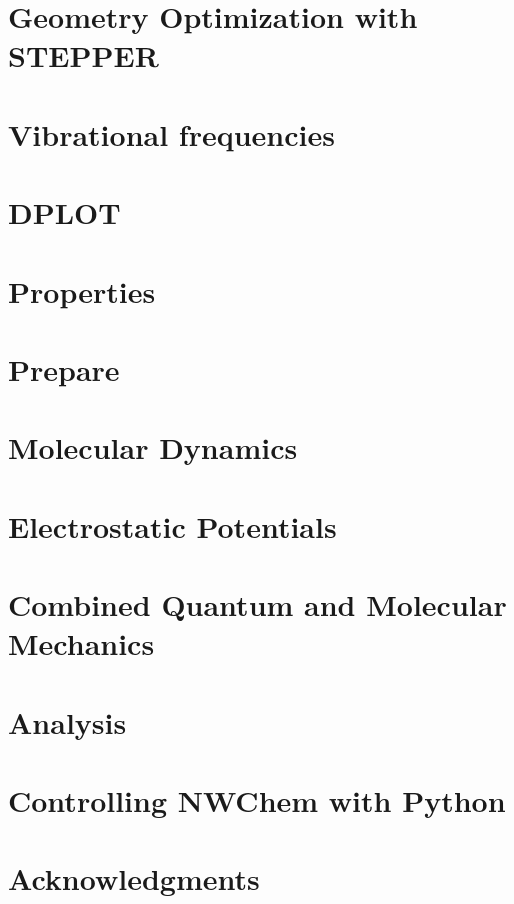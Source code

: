 \chapter{Geometry Optimization with STEPPER}


\chapter{Vibrational frequencies}


\chapter{DPLOT}


\chapter{Properties}


\chapter{Prepare}


\chapter{Molecular Dynamics}


\chapter{Electrostatic Potentials}


\chapter{Combined Quantum and Molecular Mechanics}


\chapter{Analysis}


\chapter{Controlling NWChem with Python}


\clearpage
\chapter{Acknowledgments}

\clearpage

